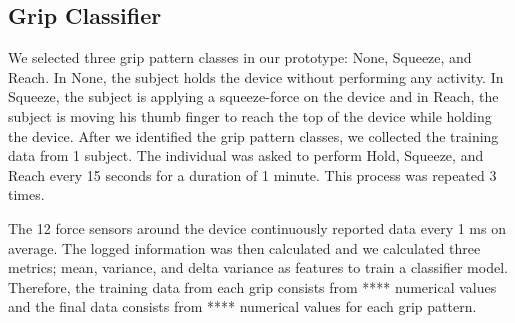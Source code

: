 \subsection{Grip Classifier}
We selected three grip pattern classes in our prototype: None, Squeeze, and Reach. In None, the subject holds the device without performing any activity. In Squeeze, the subject is applying a squeeze-force on the device and in Reach, the subject is moving his thumb finger to reach the top of the device while holding the device. After we identified the grip pattern classes, we collected the training data from 1 subject. The individual was asked to perform Hold, Squeeze, and Reach every 15 seconds for a duration of 1 minute. This process was repeated 3 times.
\par
The 12 force sensors around the device continuously reported data every 1 ms on average. The logged information was then calculated  and we calculated three metrics; mean, variance, and delta variance as features to train a classifier model. Therefore, the training data from each grip consists from **** numerical values and the final data consists from **** numerical values for each grip pattern.



